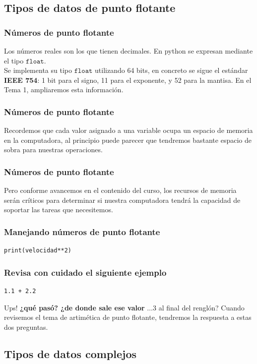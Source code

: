 \documentclass[12pt]{beamer}
\begin{document}
\subsection{Tipos de datos de punto flotante}

\begin{frame}
\frametitle{Números de punto flotante}
Los números reales son los que tienen decimales. En python se expresan mediante el tipo $\texttt{float}$.
\\
\bigskip
\pause
Se implementa su tipo $\texttt{float}$ utilizando 64 bits, en concreto se sigue el estándar \textbf{IEEE 754}: 1 bit para el signo, 11 para el exponente, y 52 para la mantisa. En el Tema 1, ampliaremos esta información.
\end{frame}
\begin{frame}
\frametitle{Números de punto flotante}
Recordemos que cada valor asignado a una variable ocupa un espacio de memoria en la computadora, \pause al principio puede parecer que tendremos bastante espacio de sobra para nuestras operaciones.
\end{frame}
\begin{frame}
\frametitle{Números de punto flotante}
Pero conforme avancemos en el contenido del curso, los recursos de memoria serán críticos para determinar si nuestra computadora tendrá la capacidad de soportar las tareas que necesitemos.
\end{frame}
\begin{frame}[fragile]
\frametitle{Manejando números de punto flotante}
\begin{lstlisting}[caption=Ejemplo con datos de punto flotante]
print(velocidad**2)
\end{lstlisting}
\end{frame}
\begin{frame}[fragile]
\frametitle{Revisa con cuidado el siguiente ejemplo}
\begin{lstlisting}[caption=Escribe y ejecute el siguiente código]
1.1 + 2.2
\end{lstlisting}
\pause
Ups! \textbf{¿qué pasó? ¿de donde sale ese valor} $\ldots 3$ al final del renglón? \pause Cuando revisemos el tema de artimética de punto flotante, tendremos la respuesta a estas dos preguntas.
\end{frame}

\subsection{Tipos de datos complejos}
\end{document}
